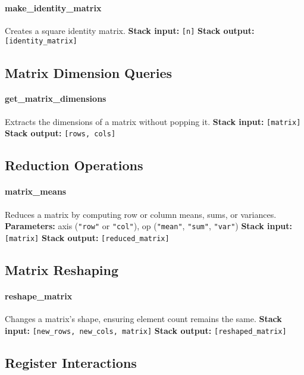 \documentclass[12pt]{article}
\begin{document}
\paragraph{make\_identity\_matrix}
Creates a square identity matrix.  
\textbf{Stack input:} \texttt{[n]}  
\textbf{Stack output:} \texttt{[identity\_matrix]}

\subsection{Matrix Dimension Queries}

\paragraph{get\_matrix\_dimensions}
Extracts the dimensions of a matrix without popping it.  
\textbf{Stack input:} \texttt{[matrix]}  
\textbf{Stack output:} \texttt{[rows, cols]}

\subsection{Reduction Operations}

\paragraph{matrix\_means}
Reduces a matrix by computing row or column means, sums, or variances.  
\textbf{Parameters:} axis (\texttt{"row"} or \texttt{"col"}), op (\texttt{"mean"}, \texttt{"sum"}, \texttt{"var"})  
\textbf{Stack input:} \texttt{[matrix]}  
\textbf{Stack output:} \texttt{[reduced\_matrix]}

\subsection{Matrix Reshaping}

\paragraph{reshape\_matrix}
Changes a matrix's shape, ensuring element count remains the same.  
\textbf{Stack input:} \texttt{[new\_rows, new\_cols, matrix]}  
\textbf{Stack output:} \texttt{[reshaped\_matrix]}

\subsection{Register Interactions}
\end{document}
